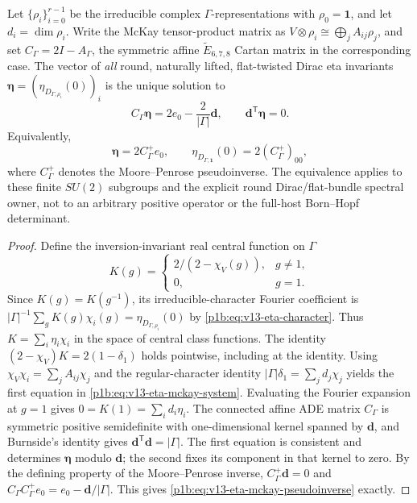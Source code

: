 \documentclass[11pt]{article}
\begin{document}
\begin{theorem}
\label{p1b:thm:v13-eta-cartangreen}
Let $\{\rho_i\}_{i=0}^{r-1}$ be the irreducible complex
$\Gamma$-representations with $\rho_0=\mathbf1$, and let
$d_i=\dim\rho_i$.  Write the McKay tensor-product matrix as
$V\otimes\rho_i\cong\bigoplus_j A_{ij}\rho_j$, and set
$C_\Gamma=2I-A_\Gamma$, the symmetric affine $\widetilde E_{6,7,8}$
Cartan matrix in the corresponding case.  The vector of \emph{all}
round, naturally lifted, flat-twisted Dirac eta invariants
$\boldsymbol\eta=(\eta_{D_{\Gamma,\rho_i}}(0))_i$
is the unique solution to
\begin{equation}
\label{p1b:eq:v13-eta-mckay-system}
 \boxed{C_\Gamma\boldsymbol\eta
 =2e_0-\frac{2}{|\Gamma|}\boldsymbol d,
 \qquad \boldsymbol d^{\mathsf T}\boldsymbol\eta=0.}
\end{equation}
Equivalently,
\begin{equation}
\label{p1b:eq:v13-eta-mckay-pseudoinverse}
 \boxed{\boldsymbol\eta=2C_\Gamma^+e_0,\qquad
 \eta_{D_{\Gamma,\mathbf1}}(0)=2(C_\Gamma^+)_{00},}
\end{equation}
where $C_\Gamma^+$ denotes the Moore--Penrose pseudoinverse.
The equivalence applies to these finite $SU(2)$ subgroups and the
explicit round Dirac/flat-bundle spectral owner, not to an
arbitrary positive operator or the full-host Born--Hopf determinant.
\end{theorem}
\begin{proof}
Define the inversion-invariant real central function on $\Gamma$
\[
 K(g)=\begin{cases}
 2/(2-\chi_V(g)),&g\ne1,\\
 0,&g=1.
 \end{cases}
\]
Since $K(g)=K(g^{-1})$, its irreducible-character Fourier
coefficient is
$|\Gamma|^{-1}\sum_g K(g)\chi_i(g)
 =\eta_{D_{\Gamma,\rho_i}}(0)$ by
\eqref{p1b:eq:v13-eta-character}. Thus
$K=\sum_i\eta_i\chi_i$ in the space of central class functions.
The identity $(2-\chi_V)K=2(1-\delta_1)$ holds pointwise,
including at the identity.  Using
$\chi_V\chi_i=\sum_jA_{ij}\chi_j$ and the regular-character identity
$|\Gamma|\delta_1=\sum_j d_j\chi_j$ yields the first equation
in \eqref{p1b:eq:v13-eta-mckay-system}.  Evaluating the Fourier
expansion at $g=1$ gives
$0=K(1)=\sum_i d_i\eta_i$.
The connected affine ADE matrix $C_\Gamma$ is symmetric positive
semidefinite with one-dimensional kernel spanned by
$\boldsymbol d$, and Burnside's identity gives
$\boldsymbol d^{\mathsf T}\boldsymbol d=|\Gamma|$.
The first equation is consistent and determines $\boldsymbol\eta$
modulo $\boldsymbol d$; the second fixes its component in that
kernel to zero. By the defining property of the Moore--Penrose
inverse, $C_\Gamma^+\boldsymbol d=0$ and
$C_\Gamma C_\Gamma^+e_0=e_0-\boldsymbol d/|\Gamma|$.
This gives \eqref{p1b:eq:v13-eta-mckay-pseudoinverse} exactly.
\end{proof}
\end{document}
